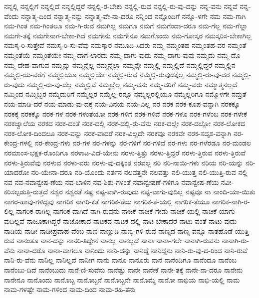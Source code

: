 {ನನ್ನಲ್ಲಿ
ನನ್ನಲ್ಲಿಗೆ
ನನ್ನಲ್ಲಿದೆ
ನನ್ನಲ್ಲಿದ್ದರೆ
ನನ್ನಲ್ಲಿ-ರ-ಬೇಕು
ನನ್ನಲ್ಲಿ-ರುವ
ನನ್ನಲ್ಲಿ-ರು-ವು-ದನ್ನು
ನನ್ನ-ವನು
ನನ್ನವೆ
ನನ್ನ-ವೆಂದು
ನನ್ನಾತ್ಮ-ದಿಂದ
ನನ್ನಾತ್ಮ-ನನ್ನು
ನನ್ನಾತ್ಮ-ವೇ-ನಾ-ದರೂ
ನನ್ನಿಂದ
ನನ್ನೊಂದಿಗೆ
ನನ್ನೊ-ಳಗೇ
ನಮ
ನಮ-ಗಾಗಿ
ನಮ-ಗಿಂತ
ನಮ-ಗಿಂತಲೂ
ನಮ-ಗಿ-ರುವ
ನಮಗಿಲ್ಲ
ನಮಗೂ
ನಮಗೆ
ನಮಗೆಂದಾ-ದರೂ
ನಮ-ಗೆಲ್ಲ
ನಮ-ಗೆಲ್ಲಾ
ನಮಗೇ-ತಕ್ಕೆ
ನಮಗೇನಾಗ-ಬೇಕಾ-ಗಿದೆ
ನಮಗೇನು
ನಮಗೇನೂ
ನಮಗೊಂದು
ನಮ-ಗೋಸ್ಕರ
ನಮಸ್ಕರಿಸ-ಬೇಕಾಗಿಲ್ಲ
ನಮಸ್ಕ-ರಿ-ಸುತ್ತೇವೆ
ನಮಸ್ಕ-ರಿ-ಸು-ವೆವು
ನಮಸ್ಕಾರ
ನಮೂದಿ-ಸಿದರು
ನಮ್ಮ
ನಮ್ಮಂತಹ
ನಮ್ಮಂತಹ-ವರ
ನಮ್ಮಂತೆ
ನಮ್ಮಂತೆಯೆ
ನಮ್ಮಂತೆಯೇ
ನಮ್ಮ-ದಾಗ-ಲಾರದು
ನಮ್ಮ-ದಾಗು-ವುದು
ನಮ್ಮ-ದಾಗು-ವುವು
ನಮ್ಮದು
ನಮ್ಮ-ದೊ
ನಮ್ಮ-ದೇಹ-ವಾಗುವ
ನಮ್ಮನ್ನು
ನಮ್ಮನ್ನೆಲ್ಲ
ನಮ್ಮನ್ನೆಲ್ಲಾ
ನಮ್ಮನ್ನೇ
ನಮ್ಮಲ್ಲಿ
ನಮ್ಮಲ್ಲಿದೆ
ನಮ್ಮಲ್ಲಿದ್ದರೆ
ನಮ್ಮಲ್ಲಿನ
ನಮ್ಮಲ್ಲಿ-ಯ-ವರೆಗೆ
ನಮ್ಮಲ್ಲಿಯೂ
ನಮ್ಮಲ್ಲಿಯೇ
ನಮ್ಮಲ್ಲಿ-ರುವ
ನಮ್ಮಲ್ಲಿ-ರುವುದಕ್ಕೆಲ್ಲ
ನಮ್ಮಲ್ಲಿ-ರು-ವು-ದರ
ನಮ್ಮಲ್ಲಿ-ರು-ವುದು
ನಮ್ಮಲ್ಲಿ-ರು-ವು-ದೆಲ್ಲ
ನಮ್ಮಲ್ಲಿವೆ
ನಮ್ಮಲ್ಲೆಲ್ಲ
ನಮ್ಮ-ವನು
ನಮ್ಮ-ವರಿಗೆ
ನಮ್ಮ-ವರು
ನಮ್ಮಾತ್ಮನಲ್ಲದೆ
ನಮ್ಮಿಂದ
ನಮ್ಮಿಬ್ಬರ
ನಮ್ಮೆದುರಿಗೆ
ನಮ್ಮೆಲ್ಲರ
ನಮ್ಮೆಲ್ಲ-ರನ್ನೂ
ನಮ್ಮೆಲ್ಲರಲ್ಲಿಯೂ
ನಮ್ಮೆಲ್ಲರಿಗೂ
ನಮ್ಮೊಳಗೇ
ನಮ್ರತೆ
ನಯ-ಮಾಡಿ-ದರೆ
ನಯ-ಮಾಡು-ವು-ದಕ್ಕೆ
ನಯ-ವಿನಯ
ನಯ-ವಿಲ್ಲ
ನರ
ನರಕ
ನರಕ-ಕೂಪ-ವನ್ನಾಗಿ
ನರಕಕ್ಕೂ
ನರಕಕ್ಕೆ
ನರಕಕ್ಕೊ
ನರಕ-ಗಳ
ನರಕ-ಗಳಂತೆಯೋ
ನರಕ-ಗಳಿಗೆ
ನರಕ-ಗಳಿವೆ
ನರಕ-ಗಳೂ
ನರಕ-ಗಳೆಂಬ
ನರಕ-ಗಳೇಕೆ
ನರಕಜ್ವಾಲೆಯ
ನರಕದ
ನರಕ-ದಂತೆ
ನರಕ-ದಲ್ಲಿ
ನರಕ-ದಲ್ಲಿ-ರು-ವೆನು
ನರಕ-ದಲ್ಲೇ
ನರಕ-ದಲ್ಲೋ
ನರಕ-ಲೋಕದ
ನರಕ-ಲೋಕ-ದಿಂದಲೂ
ನರಕ-ವನ್ನು
ನರಕ-ವಾದರೆ
ನರಕ-ವಿಲ್ಲದೇ
ನರಕವೂ
ನರಕವೇ
ನರಕ-ಸದೃಶ-ವನ್ನಾಗಿ
ನರ-ಕೇಂದ್ರ-ಗಳಲ್ಲಿ
ನರ-ಕೇಂದ್ರ-ಗಳು
ನರ-ಗಳ
ನರ-ಗಳನ್ನು
ನರ-ಗಳಿಗೆ
ನರ-ಗಳಿವೆ
ನರ-ಗಳು
ನರ-ಗಳೆರಡೂ
ನರ-ಮಂಡಲ
ನರಮಾಂಸ-ಭಕ್ಷಕ-ರೊಂದಿಗೂ
ನರಳಾಟ-ವಿದೆ-ಯೇನು
ನರಳು-ತ್ತಿತ್ತು
ನರಳು-ತ್ತಿದ್ದರೆ
ನರಳು-ತ್ತಿರುವ
ನರಳು-ತ್ತಿರುವೆ
ನರಳು-ತ್ತಿರುವೆವು
ನರಳುವ
ನರಳು-ವರು
ನರಳು-ವು-ದಕ್ಕಿಂತ
ನರವಲ್ಲ
ನರಿ
ನರಿ-ನಾಯಿ-ಗಳು
ನರಿಯ
ನರಿ-ಯನ್ನು
ನರಿ-ಯಾದರೋ
ನರಿ-ಯೇನಾ-ದರೂ
ನರಿ-ಯೊಂದು
ನರ್ತನ
ನಲವತ್ತನೇ
ನಲವತ್ತು
ನಲಿ-ಯುತ್ತ
ನಲಿ-ಯುತ್ತಿ-ರುವ
ನಲ್ಲಿ
ನವ
ನವ-ನವಾನ್ವೇಷ-ಣೆಯ
ನವ-ಬಾಳಿನ
ನವ-ಶಿಶು-ಗಳಂತೆ
ನವಾನ್ವೇಷಣೆ-ಗಳಿಗೂ
ನವಾನ್ವೇಷ-ಣೆಯ
ನವೀ-ಕರಿಸಲ್ಪಡುತ್ತಿ-ರುತ್ತದೆ
ನಶ್ವರ
ನಶ್ವರತೆ
ನಷ್ಟ
ನಷ್ಟ-ವಾಗಿ-ರುವುದು
ನಷ್ಟ-ವಾಗು-ವುದಿಲ್ಲ
ನಷ್ಟವೂ
ನಾ
ನಾಂದಿ-ಯಾ-ಯಿತು
ನಾಗರ-ಹಾವು-ಗಳಿದ್ದವು
ನಾಗರಿಕ
ನಾಗರಿ-ಕತೆ
ನಾಗರಿಕ-ತೆಯ
ನಾಗರಿಕ-ತೆ-ಯಲ್ಲಿ
ನಾಗರಿಕ-ತೆಯೂ
ನಾಗರಿಕ-ನಾಗಿ-ರ-ಲಿಲ್ಲ
ನಾಗರಿಕ-ರಾಗಿಲ್ಲ
ನಾಗರಿಕ-ವಾಗಿದೆ
ನಾಗಿ-ರುವನು
ನಾಚಿಕೆ
ನಾಚಿಕೆ-ಗೇಡು
ನಾಚಿಕೆ-ಯಲ್ಲಿ
ನಾಚಿಕೆ-ಯಾಗು-ವುದಿಲ್ಲವೆ
ನಾಜೂಕಾಗಿದ್ದರೆ
ನಾಜೋಕಾದ
ನಾಟಕದ
ನಾಟಕ-ದಲ್ಲಿ
ನಾಟ-ಬೇಕಾದರೆ
ನಾಟು-ವಂತೆ
ನಾಟು-ವುದು
ನಾಡಿಯ
ನಾಡೀ
ನಾಡೀಪ್ರವಾಹ-ವೆಂಬ
ನಾಣಿ
ನಾಣ್ಣುಡಿ
ನಾಣ್ಯ-ಗಳಿ-ರುವ
ನಾಣ್ಯದ
ನಾಣ್ಯ-ವನ್ನೂ
ನಾತಹೊಡೆ-ಯುತ್ತಿ-ರುವ
ನಾನಂತೂ
ನಾನ-ದನ್ನು
ನಾನರಿ-ತಿದ್ದೇನೆ
ನಾನಲ್ಲ
ನಾನಲ್ಲದೆ
ನಾನಾ
ನಾನಾ-ಗಲೇ
ನಾನಾಗಿ-ರುವನು
ನಾನಾಗಿ-ರು-ವೆನು
ನಾನಾ-ದರೊ
ನಾನಾ-ವಾಗಲೂ
ನಾನಿಂದು
ನಾನಿ-ದನ್ನು
ನಾನಿದ್ದೆ
ನಾನಿದ್ದೆನು
ನಾನಿ-ರು-ವು-ದ-ರಿಂದ
ನಾನಿ-ರುವೆ
ನಾನಿ-ರು-ವೆನು
ನಾನಿಲ್ಲ
ನಾನಿಲ್ಲದೆ
ನಾನೀಗ
ನಾನು
ನಾನೂ
ನಾನೂರು
ನಾನೆ
ನಾನೆಂದಿಗೂ
ನಾನೆಂದೂ
ನಾನೆಂಬ
ನಾನೆಂಬು-ದಿದೆ
ನಾನೆಂಬುದು
ನಾನೆ-ಣಿ-ಸುವೆನು
ನಾನೆಷ್ಟು
ನಾನೇ
ನಾನೇಕೆ
ನಾನೇ-ತಕ್ಕೆ
ನಾನೇ-ನಾ-ದರೂ
ನಾನೇನು
ನಾನೇನೂ
ನಾನೊಂದು
ನಾನೊಬ್ಬ
ನಾನೊಬ್ಬನೆ
ನಾನೊಬ್ಬನೇ
ನಾನೊಮ್ಮೆ
ನಾನೋ
ನಾಭಿಯ
ನಾಭಿ-ಯಲ್ಲಿ
ನಾಮ
ನಾಮ-ಗಳಷ್ಟೇ
ನಾಮ-ಗಳಿಂದ
ನಾಮ-ದಿಂದ
ನಾಮ-ರಹಿ-ತನು
}
